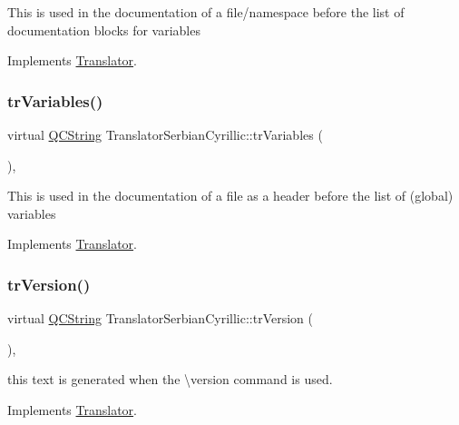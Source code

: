 This is used in the documentation of a file/namespace before the list of documentation blocks for variables 

Implements \mbox{\hyperlink{class_translator}{Translator}}.

\mbox{\label{class_translator_serbian_cyrillic_a5114b32a6afc596463b20c2aaf04f530}} 
\subsubsection{\texorpdfstring{trVariables()}{trVariables()}}
{\footnotesize\ttfamily virtual \mbox{\hyperlink{class_q_c_string}{Q\+C\+String}} Translator\+Serbian\+Cyrillic\+::tr\+Variables (\begin{DoxyParamCaption}{ }\end{DoxyParamCaption})\hspace{0.3cm}{\ttfamily [inline]}, {\ttfamily [virtual]}}

This is used in the documentation of a file as a header before the list of (global) variables 

Implements \mbox{\hyperlink{class_translator}{Translator}}.

\mbox{\label{class_translator_serbian_cyrillic_aa3ae9ebbab55efd83812aeae18c8b638}} 
\subsubsection{\texorpdfstring{trVersion()}{trVersion()}}
{\footnotesize\ttfamily virtual \mbox{\hyperlink{class_q_c_string}{Q\+C\+String}} Translator\+Serbian\+Cyrillic\+::tr\+Version (\begin{DoxyParamCaption}{ }\end{DoxyParamCaption})\hspace{0.3cm}{\ttfamily [inline]}, {\ttfamily [virtual]}}

this text is generated when the \textbackslash{}version command is used. 

Implements \mbox{\hyperlink{class_translator}{Translator}}.

